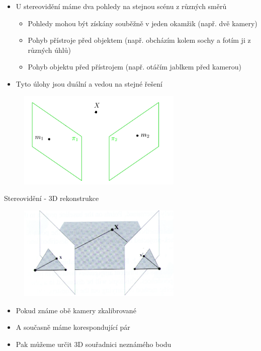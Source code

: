 \begin{frame}

\begin{itemize}
\item U stereovidění máme dva pohledy na stejnou scénu z různých směrů
\begin{itemize}
\item Pohledy mohou být získány souběžně v jeden okamžik (např. dvě kamery)
\item Pohyb přístroje před objektem (např. obcházím kolem sochy a fotím ji z různých úhlů)
\item Pohyb objektu před přístrojem (např. otáčím jablkem před kamerou)
\end{itemize}
\item Tyto úlohy jsou duální a vedou na stejné řešení
\end{itemize}
\begin{figure}[h]
\centering
\includegraphics[width=0.7\textwidth]{./epi1c}
\label{fig:epi1}
\end{figure}

\end{frame}

\begin{frame}
Stereovidění - 3D rekonstrukce

\begin{figure}[h]
\centering
\includegraphics[width=0.7\textwidth]{./epi3}
\label{fig:epi3}
\end{figure}
\begin{itemize}
\item Pokud známe obě kamery zkalibrované
\item A současně máme korespondující pár
\item Pak můžeme určit 3D souřadnici neznámého bodu
\end{itemize}
\end{frame}


